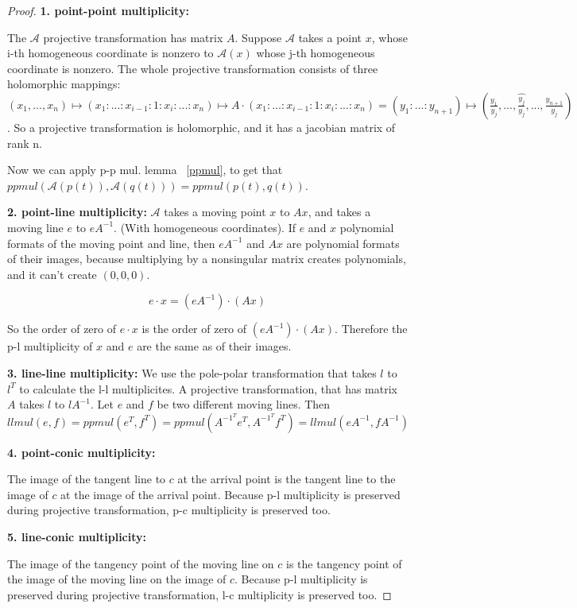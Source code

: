 \documentclass[a4paper]{article}
\begin{document}
\begin{proof}
\hfill\break
    \textbf{1. point-point multiplicity:}\label{projpp}

    The $\mathcal{A}$ projective transformation has matrix $A$. Suppose $\mathcal{A}$ takes a point $x$, whose i-th homogeneous coordinate is nonzero to $\mathcal{A}(x)$ whose j-th homogeneous coordinate is nonzero. The whole projective transformation consists of three holomorphic mappings: $(x_1, ...,x_n) \mapsto (x_1:...:x_{i-1}:1:x_i:...:x_n) \mapsto A\cdot(x_1:...:x_{i-1}:1:x_i:...:x_n)=(y_1:...:y_{n+1}) \mapsto (\frac{y_1}{y_j},...,\widehat{\frac{y_j}{y_j}},...,\frac{y_{n+1}}{y_j})$. So a projective transformation is holomorphic, and it has a jacobian matrix of rank n.

    Now we can apply p-p mul. lemma ~\ref{ppmul}, to get that $ppmul(\mathcal{A}(p(t)),\mathcal{A}(q(t)))= ppmul(p(t),q(t))$.

    \textbf{2. point-line multiplicity:}
    $\mathcal{A}$ takes a moving point $x$ to $Ax$, and takes a moving line $e$ to $eA^{-1}$. (With homogeneous coordinates). If $e$ and $x$ polynomial formats of the moving point and line, then $eA^{-1}$ and $Ax$ are polynomial formats of their images, because multiplying by a nonsingular matrix creates polynomials, and it can't create $(0,0,0)$.

    $$e\cdot x=(eA^{-1})\cdot(Ax)$$

    So the order of zero of $e\cdot x$ is the order of zero of $(eA^{-1})\cdot (Ax)$. Therefore the p-l multiplicity of $x$ and $e$ are the same as of their images.

    \textbf{3. line-line multiplicity:}
    We use the pole-polar transformation that takes $l$ to $l^T$ to calculate the l-l multiplicites. A projective transformation, that has matrix $A$ takes $l$ to $lA^{-1}$. Let $e$ and $f$ be two different moving lines. Then $$llmul(e,f)=ppmul(e^T,f^T)=ppmul(A^{-1^T}e^T,A^{-1^T}f^T)=llmul(eA^{-1},fA^{-1})$$

    \textbf{4. point-conic multiplicity:}

    The image of the tangent line to $c$ at the arrival point is the tangent line to the image of $c$ at the image of the arrival point. Because p-l multiplicity is preserved during projective transformation, p-c multiplicity is preserved too.

    \textbf{5. line-conic multiplicity:}

    The image of the tangency point of the moving line on $c$ is the tangency point of the image of the moving line on the image of $c$. Because p-l multiplicity is preserved during projective transformation, l-c multiplicity is preserved too.


\end{proof}
\end{document}
